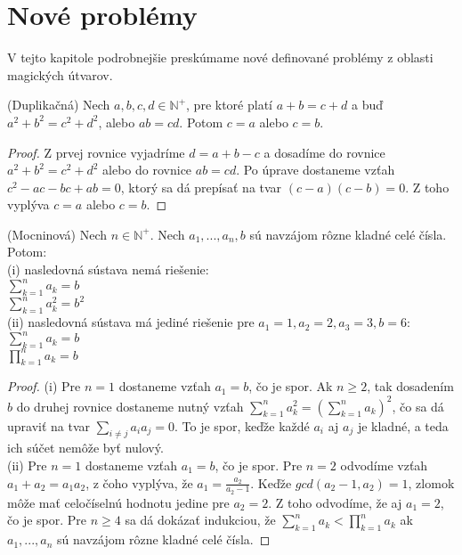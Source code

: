 \chapter{Nové problémy}

\label{kap:newproblems} %

V tejto kapitole podrobnejšie preskúmame nové definované problémy z oblasti magických útvarov. \\

\begin{lemma} (Duplikačná) Nech $a,b,c,d \in \mathbb{N^+}$, pre ktoré platí $a + b = c + d$ a buď $a^2 + b^2 = c^2 + d^2$, alebo $ab = cd$. Potom $c = a$ alebo $c = b$.
\end{lemma}
 
\begin{proof} Z prvej rovnice vyjadríme $d = a + b - c$ a dosadíme do rovnice $a^2 + b^2 = c^2 + d^2$ alebo do rovnice $ab = cd$. Po úprave dostaneme vzťah $c^2 - ac - bc + ab = 0$, ktorý sa dá prepísať na tvar $(c - a)(c - b) = 0$. Z toho vyplýva $c = a$ alebo $c = b$.
\end{proof} 

\begin{lemma} (Mocninová) Nech $n \in \mathbb{N^+}$. Nech $a_1, ... , a_n , b$ sú navzájom rôzne kladné celé čísla. Potom: \\
(i) nasledovná sústava nemá riešenie: \\
$\sum_{k=1}^{n} a_k = b$ \\
$\sum_{k=1}^{n} a^2_k = b^2$ \\
(ii) nasledovná sústava má jediné riešenie pre $a_1 = 1, a_2 = 2, a_3 = 3, b = 6$: \\
$\sum_{k=1}^{n} a_k = b$ \\
$\prod_{k=1}^{n} a_k = b$
\end{lemma}

\begin{proof} (i) Pre $n = 1$ dostaneme vzťah $a_1 = b$, čo je spor. Ak $n \geq 2$, tak dosadením $b$ do druhej rovnice dostaneme nutný vzťah $\sum_{k=1}^{n} a^2_k = (\sum_{k=1}^{n} a_k)^2$, čo sa dá upraviť na tvar $\sum_{i \neq j} a_i a_j = 0$. To je spor, keďže každé $a_i$ aj $a_j$ je kladné, a teda ich súčet nemôže byť nulový. \\

(ii) Pre $n = 1$ dostaneme vzťah $a_1 = b$, čo je spor. Pre $n = 2$ odvodíme vzťah $a_1 + a_2 = a_1 a_2$, z čoho vyplýva, že $a_1 = \frac{a_2}{a_2 - 1}$. Keďže $gcd(a_2 - 1, a_2) = 1$, zlomok môže mať celočíselnú hodnotu jedine pre $a_2 = 2$. Z toho odvodíme, že aj $a_1 = 2$, čo je spor. Pre $n \geq 4$ sa dá dokázať indukciou, že $\sum_{k=1}^{n} a_k < \prod_{k=1}^{n} a_k$ ak $a_1, ... , a_n$ sú navzájom rôzne kladné celé čísla.
\end{proof}

